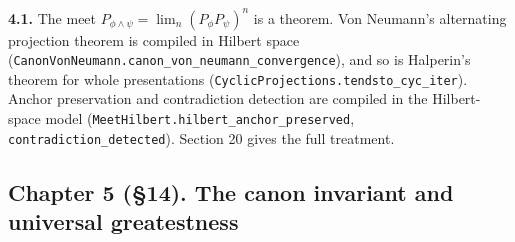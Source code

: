 \documentclass[
]{article}
\begin{document}
\textbf{4.1.} The meet \(P_{\phi\wedge\psi}=\lim_n(P_\phi P_\psi)^n\) is
a theorem. Von Neumann's alternating projection theorem is compiled in
Hilbert space
(\texttt{C\allowbreak{}a\allowbreak{}n\allowbreak{}o\allowbreak{}n\allowbreak{}V\allowbreak{}o\allowbreak{}n\allowbreak{}N\allowbreak{}e\allowbreak{}u\allowbreak{}m\allowbreak{}a\allowbreak{}n\allowbreak{}n\allowbreak{}.\allowbreak{}c\allowbreak{}a\allowbreak{}n\allowbreak{}o\allowbreak{}n\allowbreak{}\_\allowbreak{}v\allowbreak{}o\allowbreak{}n\allowbreak{}\_\allowbreak{}n\allowbreak{}e\allowbreak{}u\allowbreak{}m\allowbreak{}a\allowbreak{}n\allowbreak{}n\allowbreak{}\_\allowbreak{}c\allowbreak{}o\allowbreak{}n\allowbreak{}v\allowbreak{}e\allowbreak{}r\allowbreak{}g\allowbreak{}e\allowbreak{}n\allowbreak{}c\allowbreak{}e}),
and so is Halperin's theorem for whole presentations
(\texttt{C\allowbreak{}y\allowbreak{}c\allowbreak{}l\allowbreak{}i\allowbreak{}c\allowbreak{}P\allowbreak{}r\allowbreak{}o\allowbreak{}j\allowbreak{}e\allowbreak{}c\allowbreak{}t\allowbreak{}i\allowbreak{}o\allowbreak{}n\allowbreak{}s\allowbreak{}.\allowbreak{}t\allowbreak{}e\allowbreak{}n\allowbreak{}d\allowbreak{}s\allowbreak{}t\allowbreak{}o\allowbreak{}\_\allowbreak{}c\allowbreak{}y\allowbreak{}c\allowbreak{}\_\allowbreak{}i\allowbreak{}t\allowbreak{}e\allowbreak{}r}).
Anchor preservation and contradiction detection are compiled in the
Hilbert-space model
(\texttt{M\allowbreak{}e\allowbreak{}e\allowbreak{}t\allowbreak{}H\allowbreak{}i\allowbreak{}l\allowbreak{}b\allowbreak{}e\allowbreak{}r\allowbreak{}t\allowbreak{}.\allowbreak{}h\allowbreak{}i\allowbreak{}l\allowbreak{}b\allowbreak{}e\allowbreak{}r\allowbreak{}t\allowbreak{}\_\allowbreak{}a\allowbreak{}n\allowbreak{}c\allowbreak{}h\allowbreak{}o\allowbreak{}r\allowbreak{}\_\allowbreak{}p\allowbreak{}r\allowbreak{}e\allowbreak{}s\allowbreak{}e\allowbreak{}r\allowbreak{}v\allowbreak{}e\allowbreak{}d},
\texttt{c\allowbreak{}o\allowbreak{}n\allowbreak{}t\allowbreak{}r\allowbreak{}a\allowbreak{}d\allowbreak{}i\allowbreak{}c\allowbreak{}t\allowbreak{}i\allowbreak{}o\allowbreak{}n\allowbreak{}\_\allowbreak{}d\allowbreak{}e\allowbreak{}t\allowbreak{}e\allowbreak{}c\allowbreak{}t\allowbreak{}e\allowbreak{}d}).
Section 20 gives the full treatment.

\subsection{Chapter 5 (§14). The canon invariant and universal
greatestness}\label{chapter-5-14.-the-canon-invariant-and-universal-greatestness}
\end{document}

